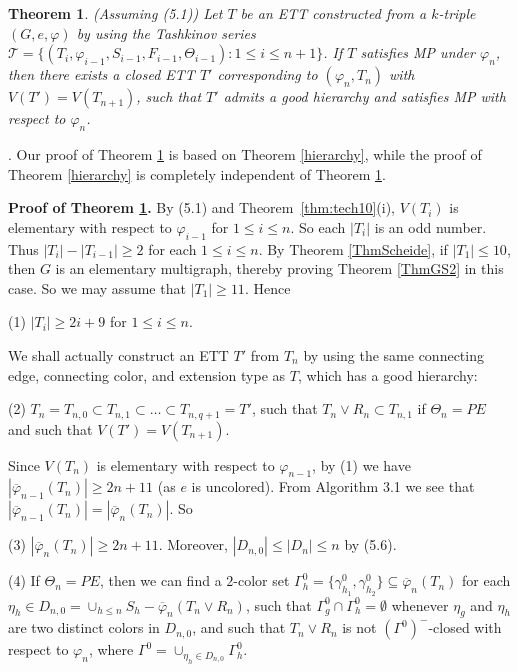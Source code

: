 \documentclass[11pt]{article}
\newtheorem{theorem}{Theorem}[section]
\newcommand{\TT}{\mathcal {T}}
\newcommand{\phibar}{\overline{\varphi}}
\newcommand{\phiv}{\varphi}
\begin{document}
\begin{theorem}\label{good}
(Assuming (5.1)) Let $T$ be an ETT constructed from a $k$-triple $(G,e, \varphi)$ by 
using the Tashkinov series $\TT=\{(T_i, \phiv_{i-1}, S_{i-1}, F_{i-1}, \Theta_{i-1}): 1\le i \le n+1\}$. If $T$ 
satisfies MP under $\varphi_n$, then there exists a closed ETT $T'$ corresponding to $(\varphi_n,T_n)$ with $V(T')=V(T_{n+1})$, 
such that $T'$ admits a good hierarchy and satisfies MP with respect to $\varphi_n$. 
\end{theorem}

. Our proof of Theorem \ref{good} is based on Theorem \ref{hierarchy},
while the proof of Theorem \ref{hierarchy} is completely independent of Theorem \ref{good}.

\vskip 2mm

{\bf Proof of Theorem \ref{good}.} By (5.1) and Theorem~\ref{thm:tech10}(i), $V(T_i)$ is elementary with respect to 
$\varphi_{i-1}$ for $1 \le i\leq n$. So each $|T_i|$ is an odd number. Thus $|T_{i}|-|T_{i-1}|\geq 2$ for each $1\le 
i\leq n$. By Theorem \ref{ThmScheide}, if $|T_1|\le 10$, then $G$ is an elementary multigraph, thereby proving Theorem 
\ref{ThmGS2} in this case. So we may assume that $|T_1|\ge 11$. Hence

(1) $|T_i| \ge 2i+9$ for $1\le i \le n$. 

We shall actually construct an ETT $T'$ from $T_n$ by using the same connecting edge, connecting 
color, and extension type as $T$, which has a good hierarchy:

(2) $T_n=T_{n,0} \subset T_{n,1} \subset \ldots \subset T_{n,q+1}=T'$, such that $T_n\vee R_n \subset T_{n,1}$ 
if $\Theta_n=PE$ and such that $V(T')=V(T_{n+1})$. 

Since $V(T_n)$ is elementary with respect to $\varphi_{n-1}$, by (1) we have $|\phibar_{n-1}(T_{n})|\ge 2n+11$
 (as $e$ is uncolored).  From Algorithm 3.1 we see that $|\phibar_{n-1}(T_{n})|=|\phibar_n(T_{n})|$. So 

(3) $|\phibar_n(T_{n})|\ge 2n+11$. Moreover, $|D_{n,0}|\le |D_n|\le n$ by (5.6). 

(4) If $\Theta_n=PE$, then we can find a $2$-color set $\Gamma^{0}_h=\{\gamma^{0}_{h_1},\gamma^{0}_{h_2}\}\subseteq 
\phibar_n(T_{n})$ for each $\eta_h\in D_{n,0}=\cup_{h\leq n}S_h-\phibar_n(T_n\vee R_n)$, such that $\Gamma^{0}_{g} \cap \Gamma^{0}_{h}=\emptyset$ whenever $\eta_{g}$ and $\eta_{h}$ are two distinct colors in $D_{n,0}$, and such that $T_{n}\vee R_n$ 
is not $(\Gamma^0)^-$-closed with respect to $\varphi_n$, where $\Gamma^{0}=\cup_{\eta_h\in D_{n,0}}\Gamma^{0}_h$.
\end{document}
